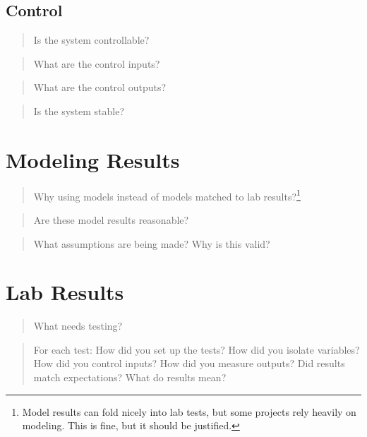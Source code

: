 \documentclass[
  10pt,
  draftcls,
  technote,
  letterpaper,
  oneside,
  onecolumn]{IEEEtran}
\begin{document}
\hypertarget{control}{%
\subsection{Control}\label{control}}

\begin{quote}
Is the system controllable?
\end{quote}

\begin{quote}
What are the control inputs?
\end{quote}

\begin{quote}
What are the control outputs?
\end{quote}

\begin{quote}
Is the system stable?
\end{quote}

\hypertarget{modeling-results}{%
\section{Modeling Results}\label{modeling-results}}

\begin{quote}
Why using models instead of models matched to lab results?\footnote{Model
  results can fold nicely into lab tests, but some projects rely heavily
  on modeling. This is fine, but it should be justified.}
\end{quote}

\begin{quote}
Are these model results reasonable?
\end{quote}

\begin{quote}
What assumptions are being made? Why is this valid?
\end{quote}

\hypertarget{lab-results}{%
\section{Lab Results}\label{lab-results}}

\begin{quote}
What needs testing?
\end{quote}

\begin{quote}
For each test: How did you set up the tests? How did you isolate
variables? How did you control inputs? How did you measure outputs? Did
results match expectations? What do results mean?
\end{quote}
\end{document}
